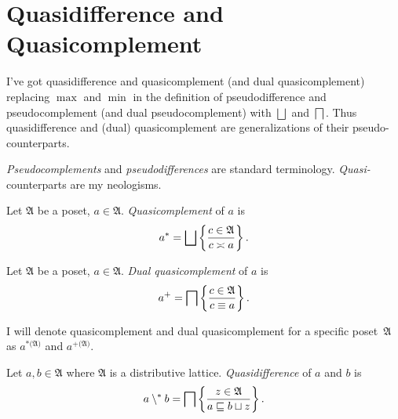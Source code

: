 \section{Quasidifference and Quasicomplement}

I've got quasidifference and quasicomplement (and dual quasicomplement)
replacing $\max$ and $\min$ in the definition of pseudodifference
and pseudocomplement (and dual pseudocomplement) with $\bigsqcup$
and $\bigsqcap$. Thus quasidifference and (dual) quasicomplement
are generalizations of their pseudo- counterparts.
\begin{rem}
\emph{Pseudocomplements} and \emph{pseudodifferences} are standard
terminology. \emph{Quasi-} counterparts are my neologisms.\end{rem}
\begin{defn}
Let $\mathfrak{A}$ be a poset, $a\in\mathfrak{A}$.
\emph{Quasicomplement} of $a$ is
\[
a^{\ast}=\bigsqcup\setcond{c\in\mathfrak{A}}{c\asymp a}.
\]

\end{defn}

\begin{defn}
Let $\mathfrak{A}$ be a poset, $a\in\mathfrak{A}$.
\emph{Dual quasicomplement} of $a$ is
\[
a^{+}=\bigsqcap\left\{ \frac{c\in\mathfrak{A}}{c\equiv a}\right\}.
\]

\end{defn}
I will denote quasicomplement and dual quasicomplement for a specific
poset~$\mathfrak{A}$ as $a^{\ast(\mathfrak{A)}}$ and $a^{+(\mathfrak{A)}}$.
\begin{defn}
Let $a,b\in\mathfrak{A}$ where $\mathfrak{A}$
is a distributive lattice. \emph{Quasidifference} of $a$ and $b$
is
\[
a\setminus^{\ast} b=\bigsqcap\left\{ \frac{z\in\mathfrak{A}}{a\sqsubseteq b\sqcup z}\right\}.
\]

\end{defn}

